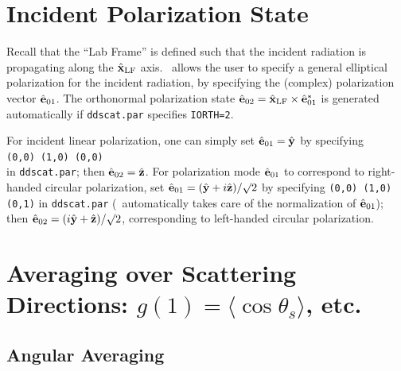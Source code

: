 \section{Incident Polarization State\label{sec:incident_polarization}}

Recall that the ``Lab Frame'' is defined such that the incident radiation
is propagating along the $\hat{\bf x}_{\rm LF}$ axis.
\ddscat\ allows the user to specify a 
general elliptical polarization
for the incident radiation, by specifying the (complex) polarization
vector ${\hat{\bf e}}_{01}$.
The orthonormal polarization state 
${\hat{\bf e}}_{02}=\hat{\bf x}_{\rm LF}\times{\hat{\bf e}}_{01}^*$ is
generated automatically if {\tt ddscat.par} specifies {\tt IORTH=2}.

For incident linear polarization, one can simply set ${\hat{\bf
e}}_{01}={\hat{\bf y}}$ by specifying \\
{\tt (0,0) (1,0) (0,0)}\\
in {\tt ddscat.par}; then ${\hat{\bf e}}_{02}={\hat{\bf z}}$. 
For polarization
mode ${\hat{\bf e}}_{01}$ to correspond to right-handed circular
polarization, set ${\hat{\bf e}}_{01}=({\hat{\bf y}}+i{\hat{\bf
z}})/\surd2$ by specifying {\tt (0,0) (1,0) (0,1)} in {\tt ddscat.par}
(\ddscat\ automatically takes care of the normalization of
${\hat{\bf e}}_{01}$); then 
${\hat{\bf e}}_{02}=(i{\hat{\bf y}}+{\hat{\bf z}})/\surd2$, 
corresponding to left-handed circular polarization.

\section{Averaging over Scattering Directions: 
         $g(1)=\langle\cos\theta_s\rangle$, 
	etc.\label{sec:averaging_scattering}}
\subsection{Angular Averaging}

